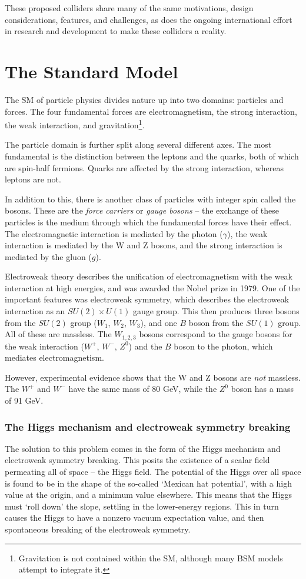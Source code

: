 These proposed colliders share many of the same motivations, design considerations, features, and challenges, as does the ongoing international effort in research and development to make these colliders a reality.

\section{The Standard Model}
The \acrlong{SM} of particle physics divides nature up into two domains: particles and forces. The four fundamental forces are electromagnetism, the strong interaction, the weak interaction, and gravitation\footnote{Gravitation is not contained within the \acrshort{SM}, although many \acrshort{BSM} models attempt to integrate it.}.

The particle domain is further split along several different axes. The most fundamental is the distinction between the leptons and the quarks, both of which are spin-half fermions. Quarks are affected by the strong interaction, whereas leptons are not. 

In addition to this, there is another class of particles with integer spin called the bosons. These are the \textit{force carriers} or \textit{gauge bosons} -- the exchange of these particles is the medium through which the fundamental forces have their effect. The electromagnetic interaction is mediated by the photon ($\gamma$), the weak interaction is mediated by the W and Z bosons, and the strong interaction is mediated by the gluon ($g$). 

Electroweak theory describes the unification of electromagnetism with the weak interaction at high energies, and was awarded the Nobel prize in 1979. One of the important features was electroweak symmetry, which describes the electroweak interaction as an $SU(2) \times U(1)$ gauge group. This then produces three bosons from the $SU(2)$ group ($W_1$, $W_2$, $W_3$), and one $B$ boson from the $SU(1)$ group. All of these are massless. The $W_{1,2,3}$ bosons correspond to the gauge bosons for the weak interaction ($W^+$, $W^-$, $Z^0$) and the $B$ boson to the photon, which mediates electromagnetism.

However, experimental evidence shows that the W and Z bosons are \textit{not} massless. The $W^+$ and $W^-$ have the same mass of 80 GeV, while the $Z^0$ boson has a mass of 91 GeV.

\subsubsection{The Higgs mechanism and electroweak symmetry breaking}
The solution to this problem comes in the form of the Higgs mechanism and electroweak symmetry breaking. This posits the existence of a scalar field permeating all of space -- the Higgs field. The potential of the Higgs over all space is found to be in the shape of the so-called `Mexican hat potential', with a high value at the origin, and a minimum value elsewhere. This means that the Higgs must `roll down' the slope, settling in the lower-energy regions. This in turn causes the Higgs to have a nonzero vacuum expectation value, and then spontaneous breaking of the electroweak symmetry.

